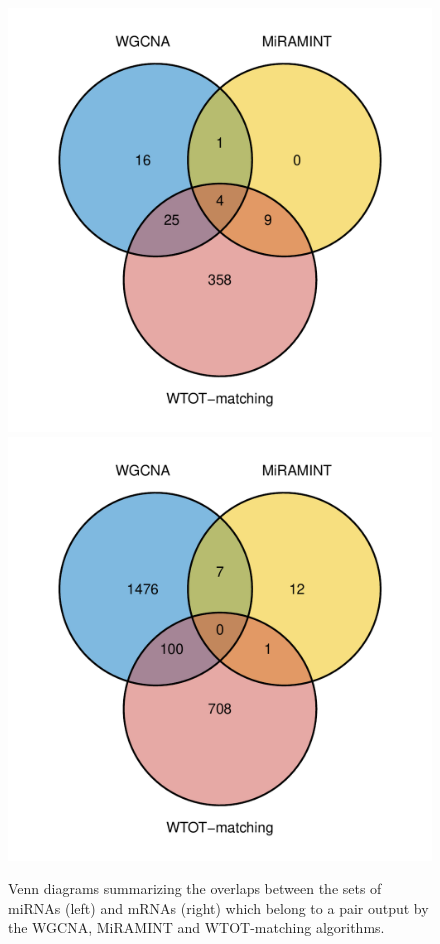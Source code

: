 \begin{figure}
  \centering
  \includegraphics[width=.45\textwidth]{images/miRNA_striatum_all.pdf}
  \includegraphics[width=.45\textwidth]{images/mRNA_striatum_all.pdf}
  \caption{Venn diagrams summarizing  the overlaps between the  sets of miRNAs
    (left)  and mRNAs  (right) which  belong to  a pair  output by  the WGCNA,
    MiRAMINT and WTOT-matching algorithms.}
  \label{fig:venn:all}
\end{figure}

